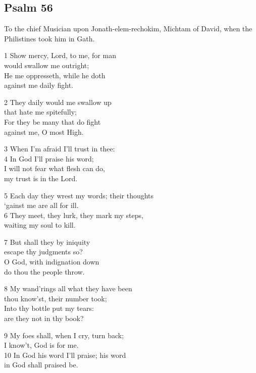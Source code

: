 \begin{center}
\quad{}\quad{}
\end{center}

\subsection*{Psalm 56}


To the chief Musician upon Jonath-elem-rechokim, Michtam of David, when the Philistines took him in Gath.

1 Show mercy, Lord, to me, for man\\
would swallow me outright;\\
He me oppresseth, while he doth\\
against me daily fight.

2 They daily would me swallow up\\
that hate me spitefully;\\
For they be many that do fight\\
against me, O most High.

3 When I’m afraid I’ll trust in thee:\\
4 In God I’ll praise his word;\\
I will not fear what flesh can do,\\
my trust is in the Lord.

5 Each day they wrest my words; their thoughts\\
‘gainst me are all for ill.\\
6 They meet, they lurk, they mark my steps,\\
waiting my soul to kill.

7 But shall they by iniquity\\
escape thy judgments so?\\
O God, with indignation down\\
do thou the people throw.

8 My wand’rings all what they have been\\
thou know’st, their number took;\\
Into thy bottle put my tears:\\
are they not in thy book?

9 My foes shall, when I cry, turn back;\\
I know’t, God is for me.\\
10 In God his word I’ll praise; his word\\
in God shall praised be.

